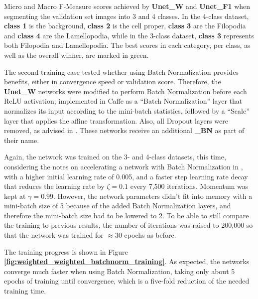 \begin {table}
\caption[Micro and Macro F-Measure scores for \textbf{Unet\_W} and \textbf{Unet\_F1}.]{Micro and Macro F-Measure scores achieved by \textbf{Unet\_W} and \textbf{Unet\_F1} when segmenting the validation set images into 3 and 4 classes. In the 4-class dataset, \textbf{class 1} is the background, \textbf{class 2} is the cell proper, \textbf{class 3} are the Filopodia and \textbf{class 4} are the Lamellopodia, while in the 3-class dataset, \textbf{class 3} represents both Filopodia and Lamellopodia. The best scores in each category, per class, as well as the overall winner, are marked in green.}
\label{tab:results1}
\end {table}

\noindent The second training case tested whether using Batch Normalization provides benefits, either in convergence speed or validation score. Therefore, the \textbf{Unet\_W} networks were modified to perform Batch Normalization before each ReLU activation, implemented in Caffe as a ``Batch Normalization'' layer that normalizes its input according to the mini-batch statistics, followed by a ``Scale'' layer that applies the affine transformation. Also, all Dropout layers were removed, as advised in \cite{batchnorm}. These networks receive an additional \textbf{\_BN} as part of their name.

Again, the network was trained on the 3- and 4-class datasets, this time, considering the notes on accelerating a network with Batch Normalization in \cite{batchnorm}, with a higher initial learning rate of 0.005, and a faster step learning rate decay that reduces the learning rate by $\zeta = 0.1$ every 7,500 iterations. Momentum was kept at $\gamma = 0.99$. However, the network parameters didn't fit into memory with a mini-batch size of 5 because of the added Batch Normalization layers, and therefore the mini-batch size had to be lowered to 2. To be able to still compare the training to previous results, the number of iterations was raised to 200,000 so that the network was trained for $\approx$30 epochs as before.

The training progress is shown in Figure \textbf{\ref{fig:weighted_weighted_batchnorm_training}}. As expected, the networks converge much faster when using Batch Normalization, taking only about 5 epochs of training until convergence, which is a five-fold reduction of the needed training time.\\


